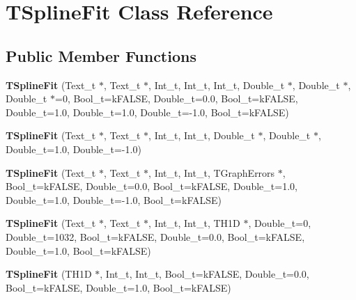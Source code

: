 \hypertarget{classTSplineFit}{
\section{TSplineFit Class Reference}
\label{classTSplineFit}
}
\subsection*{Public Member Functions}
\begin{DoxyCompactItemize}
\item 
\hypertarget{classTSplineFit_a73d3664e6c41136c8e7a44939ab9446d}{
{\bfseries TSplineFit} (Text\_\-t $\ast$, Text\_\-t $\ast$, Int\_\-t, Int\_\-t, Int\_\-t, Double\_\-t $\ast$, Double\_\-t $\ast$, Double\_\-t $\ast$=0, Bool\_\-t=kFALSE, Double\_\-t=0.0, Bool\_\-t=kFALSE, Double\_\-t=1.0, Double\_\-t=1.0, Double\_\-t=-\/1.0, Bool\_\-t=kFALSE)}
\label{classTSplineFit_a73d3664e6c41136c8e7a44939ab9446d}

\item 
\hypertarget{classTSplineFit_a64ae4d613a635d549d981556e197cef7}{
{\bfseries TSplineFit} (Text\_\-t $\ast$, Text\_\-t $\ast$, Int\_\-t, Int\_\-t, Double\_\-t $\ast$, Double\_\-t $\ast$, Double\_\-t=1.0, Double\_\-t=-\/1.0)}
\label{classTSplineFit_a64ae4d613a635d549d981556e197cef7}

\item 
\hypertarget{classTSplineFit_aaefc1bc418abac377297ef86a25e9329}{
{\bfseries TSplineFit} (Text\_\-t $\ast$, Text\_\-t $\ast$, Int\_\-t, Int\_\-t, TGraphErrors $\ast$, Bool\_\-t=kFALSE, Double\_\-t=0.0, Bool\_\-t=kFALSE, Double\_\-t=1.0, Double\_\-t=1.0, Double\_\-t=-\/1.0, Bool\_\-t=kFALSE)}
\label{classTSplineFit_aaefc1bc418abac377297ef86a25e9329}

\item 
\hypertarget{classTSplineFit_a60c8f52793583adfc19dcd144a008202}{
{\bfseries TSplineFit} (Text\_\-t $\ast$, Text\_\-t $\ast$, Int\_\-t, Int\_\-t, TH1D $\ast$, Double\_\-t=0, Double\_\-t=1032, Bool\_\-t=kFALSE, Double\_\-t=0.0, Bool\_\-t=kFALSE, Double\_\-t=1.0, Bool\_\-t=kFALSE)}
\label{classTSplineFit_a60c8f52793583adfc19dcd144a008202}

\item 
\hypertarget{classTSplineFit_a4ee04eb101d0deec8abab21994d90458}{
{\bfseries TSplineFit} (TH1D $\ast$, Int\_\-t, Int\_\-t, Bool\_\-t=kFALSE, Double\_\-t=0.0, Bool\_\-t=kFALSE, Double\_\-t=1.0, Bool\_\-t=kFALSE)}
\label{classTSplineFit_a4ee04eb101d0deec8abab21994d90458}


\end{DoxyCompactItemize}
